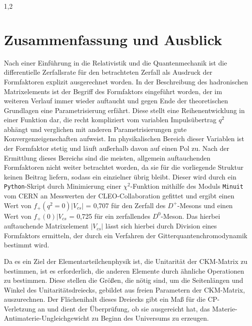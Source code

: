\documentclass[11pt,a4paper,twoside]{report}
\begin{document}
\begin{spacing}{1,2}
\chapter{Zusammenfassung und Ausblick}
Nach einer Einführung in die Relativistik und die Quantenmechanik ist die differentielle Zerfallsrate für den betrachteten Zerfall als Ausdruck der 
Formfaktoren explizit ausgerechnet worden. In der Beschreibung des hadronischen Matrixelements ist der Begriff des Formfaktors eingeführt worden,
der im weiteren Verlauf immer wieder auftaucht und gegen Ende der theoretischen Grundlagen eine Parametrisierung erfährt. Diese stellt eine 
Reihenentwicklung in einer Funktion dar, die recht kompliziert vom variablen Impulsübertrag $q^2$ abhängt und verglichen mit anderen Parametrisierungen
gute Konvergenzeigenschaften aufweist. Im physikalischen Bereich dieser Variablen ist der Formfaktor stetig und läuft außerhalb davon auf einen Pol zu.
Nach der Ermittlung dieses Bereichs sind die meisten, allgemein auftauchenden Formfaktoren nicht weiter betrachtet worden, da sie für die vorliegende
Struktur keinen Beitrag liefern, sodass ein einzielner übrig bleibt. Dieser wird durch ein \texttt{Python}-Skript durch Minimierung einer 
$\chi^2$-Funktion mithilfe des Moduls \texttt{Minuit} vom CERN an Messwerten der CLEO-Collaboration gefittet und ergibt einen Wert von $f_+(q^2=0) |V_{cs}|$ = 0,707 für den Zerfall des $D^+$-Mesons
und einen Wert von $f_+(0)|V_{cs}$ = 0,725 für ein zerfallendes $D^0$-Meson. Das hierbei auftauchende Matrixelement $|V_{cs}|$ lässt sich hierbei
durch Division eines Formfaktors ermitteln, der durch ein Verfahren der Gitterquantenchromodynamik bestimmt wird. 

\noindent
Da es ein Ziel der Elementarteilchenphysik ist, die Unitarität der CKM-Matrix zu bestimmen, ist es erforderlich, die anderen Elemente durch ähnliche
Operationen zu bestimmen. Diese stellen die Größen, die nötig sind, um die Seitenlängen und Winkel des Unitaritätsdreiecks, gebildet aus freien 
Parametern der CKM-Matrix, auszurechnen. Der Flächenihalt dieses Dreiecks gibt ein Maß für die CP-Verletzung an und dient der Überprüfung, ob sie
ausgereicht hat, das Materie-Antimaterie-Ungleichgewicht zu Beginn des Universums zu erzeugen. 



\begin{appendix}
%
\end{appendix}
\newpage



\end{spacing}
\end{document}
